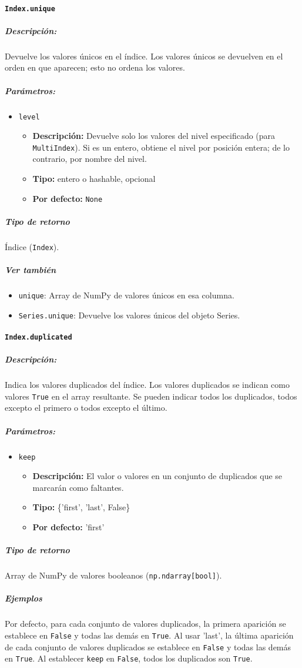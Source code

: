 \paragraph{\texttt{Index.unique}}
\subparagraph{Descripción:}
Devuelve los valores únicos en el índice. Los valores únicos se devuelven en el orden en que aparecen; esto no ordena los valores.
\subparagraph{Parámetros:}
\begin{itemize}
\item \texttt{level}
\begin{itemize}
\item \textbf{Descripción:} Devuelve solo los valores del nivel especificado (para \texttt{MultiIndex}). Si es un entero, obtiene el nivel por posición entera; de lo contrario, por nombre del nivel.
\item \textbf{Tipo:} entero o hashable, opcional
\item \textbf{Por defecto:} \texttt{None}
\end{itemize}
\end{itemize}
\subparagraph{Tipo de retorno}
Índice (\texttt{Index}).
\subparagraph{Ver también}
\begin{itemize}
\item \texttt{unique}: Array de NumPy de valores únicos en esa columna.
\item \texttt{Series.unique}: Devuelve los valores únicos del objeto Series.
\end{itemize}
\paragraph{\texttt{Index.duplicated}}
\subparagraph{Descripción:}
Indica los valores duplicados del índice. Los valores duplicados se indican como valores \texttt{True} en el array resultante. Se pueden indicar todos los duplicados, todos excepto el primero o todos excepto el último.
\subparagraph{Parámetros:}
\begin{itemize}
\item \texttt{keep}
\begin{itemize}
\item \textbf{Descripción:} El valor o valores en un conjunto de duplicados que se marcarán como faltantes.
\item \textbf{Tipo:} \{'first', 'last', False\}
\item \textbf{Por defecto:} 'first'
\end{itemize}
\end{itemize}
\subparagraph{Tipo de retorno}
Array de NumPy de valores booleanos (\texttt{np.ndarray[bool]}).
\subparagraph{Ejemplos}
Por defecto, para cada conjunto de valores duplicados, la primera aparición se establece en \texttt{False} y todas las demás en \texttt{True}. Al usar 'last', la última aparición de cada conjunto de valores duplicados se establece en \texttt{False} y todas las demás en \texttt{True}. Al establecer \texttt{keep} en \texttt{False}, todos los duplicados son \texttt{True}.
